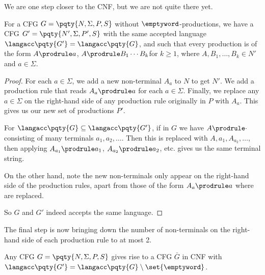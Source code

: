 We are one step closer to the CNF, but we are not quite there yet.

\begin{lemma}
    \label{lem:remove-mix}%
    For a CFG \(G = \pqty{N, \Sigma, P, S}\) without \(\emptyword\)-productions, we have a CFG \(G' = \pqty{N', \Sigma, P', S}\) with the same accepted language \(\langacc\pqty{G'} = \langacc\pqty{G}\), and such that every production is of the form \(A \prodrule a\), \(A \prodrule B_1 \cdots B_k\)for \(k \geq 1\), where \(A, B_1, \ldots, B_k \in N'\) and \(a \in \Sigma\).
\end{lemma}

\begin{proof}
    For each \(a \in \Sigma\), we add a new non-terminal \(A_a\) to \(N\) to get \(N'\). We add a production rule that reads \(A_a \prodrule a\) for each \(a \in \Sigma\). Finally, we replace any \(a \in \Sigma\) on the right-hand side of any production rule originally in \(P\) with \(A_a\). This gives us our new set of productions \(P'\).

    For \(\langacc\pqty{G} \subseteq \langacc\pqty{G'}\), if in \(G\) we have \(A \prodrule \cdot\) consisting of many terminals \(a_1, a_2, \ldots\). Then this is replaced with \(A,{a_1}, A_{a_2}, \ldots\), then applying \(A_{a_1} \prodrule a_1\), \(A_{a_2} \prodrule a_2\), etc. gives us the same terminal string.

    On the other hand, note the new non-terminals only appear on the right-hand side of the production rules, apart from those of the form \(A_{a} \prodrule a\) where are replaced.

    So \(G\) and \(G'\) indeed accepts the same language.
\end{proof}

The final step is now bringing down the number of non-terminals on the right-hand side of each production rule to at most 2.

\begin{theorem}
    \label{thm:chomsky-normal-form}%
    Any CFG \(G = \pqty{N, \Sigma, P, S}\) gives rise to a CFG \(\bar{G} \) in CNF with \(\langacc\pqty{G'} = \langacc\pqty{G} \setminus \set{\emptyword}\).
\end{theorem}


